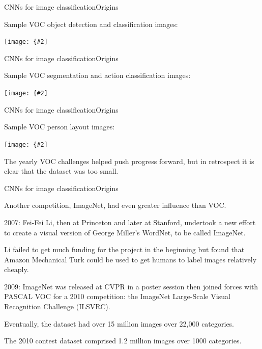 \documentclass{beamer}
\newcommand{\myfig}[3]{\centerline{\texttt{[image: \{\#2]}}}
\begin{document}
\begin{frame}{CNNs for image classification}{Origins}

  Sample VOC object detection and classification images:

  \myfig{4.5in}{everingham-fig1}{Everingham et al.\ (2015), Fig.\ 1a}

\end{frame}


\begin{frame}{CNNs for image classification}{Origins}

  Sample VOC segmentation and action classification images:

  \myfig{4.5in}{everingham-fig1bc}{Everingham et al.\ (2015), Fig.\ 1b-c}

\end{frame}


\begin{frame}{CNNs for image classification}{Origins}

  Sample VOC person layout images:

  \medskip
  
  \myfig{4.5in}{everingham-fig1d}{Everingham et al.\ (2015), Fig.\ 1d}

  \medskip
  
  The yearly VOC challenges helped push progress forward, but in retrospect
  it is clear that the dataset was too small.

\end{frame}


\begin{frame}{CNNs for image classification}{Origins}

  Another competition, ImageNet, had even greater influence than VOC.

  \medskip
  
  2007: Fei-Fei Li, then at Princeton and later at Stanford, undertook
  a new effort to create a visual version of George Miller's WordNet,
  to be called ImageNet.

  \medskip

  Li failed to get much funding for the project in the beginning but
  found that Amazon Mechanical Turk could be used to get humans to
  label images relatively cheaply.

  \medskip

  2009: ImageNet was released at CVPR in a poster session then joined
  forces with PASCAL VOC for a 2010 competition: the \alert{ImageNet
  Large-Scale Visual Recognition Challenge (ILSVRC)}.

  \medskip

  Eventually, the dataset had over 15 million images over 22,000 categories.

  \medskip

  The 2010 contest dataset comprised 1.2 million images over 1000 categories.
  
\end{frame}
\end{document}
